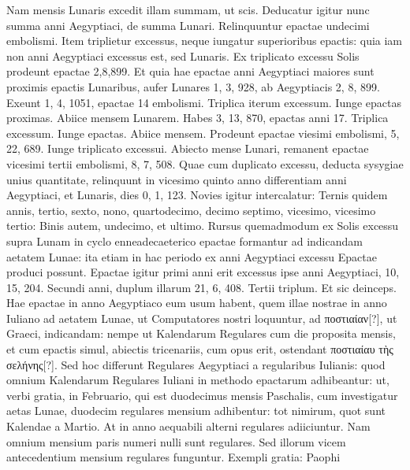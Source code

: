Nam mensis Lunaris excedit illam summam, ut scis.
Deducatur
igitur nunc summa anni Aegyptiaci, de summa Lunari.
Relinquuntur
epactae undecimi embolismi.
Item triplietur excessus, neque iungatur
superioribus epactis: quia iam non anni Aegyptiaci excessus est,
sed Lunaris.
Ex triplicato excessu Solis prodeunt epactae 2,8,899.
Et quia hae epactae anni Aegyptiaci maiores sunt proximis epactis
 Lunaribus,
aufer Lunares 1, 3, 928, ab Aegyptiacis 2, 8, 899.
Exeunt
1, 4, 1051, epactae 14 embolismi.
Triplica iterum excessum.
Iunge
epactas proximas.
Abiice mensem Lunarem.
Habes 3, 13, 870,
epactas anni 17.
Triplica excessum.
Iunge epactas.
Abiice mensem.
Prodeunt epactae viesimi embolismi, 5, 22, 689.
Iunge triplicato
excessui.
Abiecto mense Lunari, remanent epactae vicesimi tertii
embolismi, 8, 7, 508.
Quae cum duplicato excessu, deducta sysygiae
unius quantitate, relinquunt in vicesimo quinto anno differentiam
anni Aegyptiaci, et Lunaris, dies 0, 1, 123.
Novies igitur intercalatur:
Ternis quidem annis, tertio, sexto, nono, quartodecimo, decimo
septimo, vicesimo, vicesimo tertio: Binis autem, undecimo,
et ultimo.
Rursus quemadmodum ex Solis excessu supra Lunam in
cyclo enneadecaeterico epactae formantur ad indicandam aetatem
Lunae: ita etiam in hac periodo ex anni Aegyptiaci excessu Epactae
produci possunt.
Epactae igitur primi anni erit excessus ipse anni
Aegyptiaci, 10, 15, 204.
Secundi anni, duplum illarum 21, 6, 408.
Tertii triplum.
Et sic deinceps.
Hae epactae in anno Aegyptiaco eum
usum habent, quem illae nostrae in anno Iuliano ad aetatem Lunae, ut
Computatores nostri loquuntur, ad \textgreek{ποστιαίαν}[?],
 ut Graeci, indicandam:
nempe ut Kalendarum Regulares cum die proposita mensis, et cum
epactis simul, abiectis tricenariis, cum opus erit,
 ostendant \textgreek{ποστιαίαυ τὴς
σελήνης}[?].
Sed hoc differunt Regulares Aegyptiaci a regularibus Iulianis:
quod omnium Kalendarum Regulares Iuliani in methodo epactarum
adhibeantur: ut, verbi gratia, in Februario, qui est duodecimus
mensis Paschalis, cum investigatur aetas Lunae, duodecim regulares
mensium adhibentur: tot nimirum, quot sunt Kalendae a
Martio.
%
At in anno aequabili alterni regulares adiiciuntur.
Nam omnium
mensium paris numeri nulli sunt regulares.
Sed illorum vicem
antecedentium mensium regulares funguntur.
Exempli gratia: Paophi
